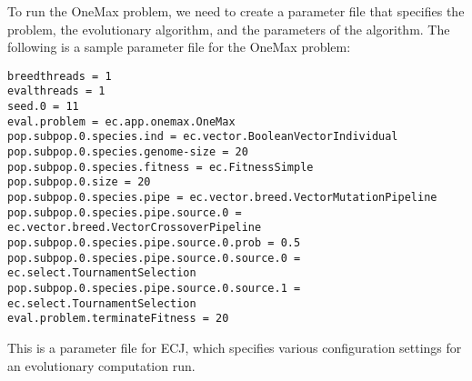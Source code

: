 To run the OneMax problem, we need to create a parameter file that specifies the problem, the evolutionary algorithm, and the parameters of the algorithm. The following is a sample parameter file for the OneMax problem:

\begin{verbatim}
breedthreads = 1
evalthreads = 1
seed.0 = 11
eval.problem = ec.app.onemax.OneMax
pop.subpop.0.species.ind = ec.vector.BooleanVectorIndividual
pop.subpop.0.species.genome-size = 20
pop.subpop.0.species.fitness = ec.FitnessSimple
pop.subpop.0.size = 20
pop.subpop.0.species.pipe = ec.vector.breed.VectorMutationPipeline
pop.subpop.0.species.pipe.source.0 = ec.vector.breed.VectorCrossoverPipeline
pop.subpop.0.species.pipe.source.0.prob = 0.5
pop.subpop.0.species.pipe.source.0.source.0 = ec.select.TournamentSelection
pop.subpop.0.species.pipe.source.0.source.1 = ec.select.TournamentSelection
eval.problem.terminateFitness = 20
\end{verbatim}

This is a parameter file for ECJ, which specifies various configuration settings for an evolutionary computation run. 

